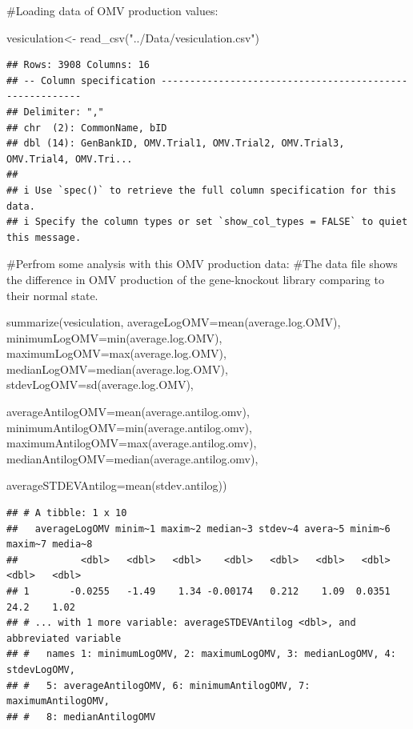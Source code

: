 \documentclass[
]{article}
\newenvironment{Shaded}{\begin{snugshade}}{\end{snugshade}}
\newcommand{\AttributeTok}[1]{\textcolor[rgb]{0.77,0.63,0.00}{#1}}
\newcommand{\FunctionTok}[1]{\textcolor[rgb]{0.00,0.00,0.00}{#1}}
\newcommand{\NormalTok}[1]{#1}
\newcommand{\OtherTok}[1]{\textcolor[rgb]{0.56,0.35,0.01}{#1}}
\newcommand{\StringTok}[1]{\textcolor[rgb]{0.31,0.60,0.02}{#1}}
\begin{document}
\#Loading data of OMV production values:

\begin{Shaded}
\begin{Highlighting}[]
\NormalTok{vesiculation}\OtherTok{\textless{}{-}} \FunctionTok{read\_csv}\NormalTok{(}\StringTok{"../Data/vesiculation.csv"}\NormalTok{)}
\end{Highlighting}
\end{Shaded}

\begin{verbatim}
## Rows: 3908 Columns: 16
## -- Column specification --------------------------------------------------------
## Delimiter: ","
## chr  (2): CommonName, bID
## dbl (14): GenBankID, OMV.Trial1, OMV.Trial2, OMV.Trial3, OMV.Trial4, OMV.Tri...
## 
## i Use `spec()` to retrieve the full column specification for this data.
## i Specify the column types or set `show_col_types = FALSE` to quiet this message.
\end{verbatim}

\#Perfrom some analysis with this OMV production data: \#The data file
shows the difference in OMV production of the gene-knockout library
comparing to their normal state.

\begin{Shaded}
\begin{Highlighting}[]
\FunctionTok{summarize}\NormalTok{(vesiculation, }
          \AttributeTok{averageLogOMV=}\FunctionTok{mean}\NormalTok{(average.log.OMV), }
          \AttributeTok{minimumLogOMV=}\FunctionTok{min}\NormalTok{(average.log.OMV),}
          \AttributeTok{maximumLogOMV=}\FunctionTok{max}\NormalTok{(average.log.OMV),}
          \AttributeTok{medianLogOMV=}\FunctionTok{median}\NormalTok{(average.log.OMV),}
          \AttributeTok{stdevLogOMV=}\FunctionTok{sd}\NormalTok{(average.log.OMV),}
          
          \AttributeTok{averageAntilogOMV=}\FunctionTok{mean}\NormalTok{(average.antilog.omv),}
          \AttributeTok{minimumAntilogOMV=}\FunctionTok{min}\NormalTok{(average.antilog.omv),}
          \AttributeTok{maximumAntilogOMV=}\FunctionTok{max}\NormalTok{(average.antilog.omv),}
          \AttributeTok{medianAntilogOMV=}\FunctionTok{median}\NormalTok{(average.antilog.omv),}
          
          \AttributeTok{averageSTDEVAntilog=}\FunctionTok{mean}\NormalTok{(stdev.antilog))}
\end{Highlighting}
\end{Shaded}

\begin{verbatim}
## # A tibble: 1 x 10
##   averageLogOMV minim~1 maxim~2 median~3 stdev~4 avera~5 minim~6 maxim~7 media~8
##           <dbl>   <dbl>   <dbl>    <dbl>   <dbl>   <dbl>   <dbl>   <dbl>   <dbl>
## 1       -0.0255   -1.49    1.34 -0.00174   0.212    1.09  0.0351    24.2    1.02
## # ... with 1 more variable: averageSTDEVAntilog <dbl>, and abbreviated variable
## #   names 1: minimumLogOMV, 2: maximumLogOMV, 3: medianLogOMV, 4: stdevLogOMV,
## #   5: averageAntilogOMV, 6: minimumAntilogOMV, 7: maximumAntilogOMV,
## #   8: medianAntilogOMV
\end{verbatim}
\end{document}
